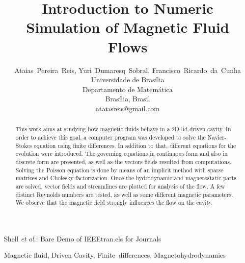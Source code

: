 \documentclass[journal]{IEEEtran}
\begin{document}
\title{Introduction to Numeric Simulation of Magnetic Fluid Flows}

\author{Ataias~Pereira~Reis, Yuri~Dumaresq~Sobral, Francisco~Ricardo~da~Cunha\\Universidade de Brasília\\Departamento de Matemática\\Brasília, Brasil\\ataiasreis@gmail.com}

%
{Shell \MakeLowercase{\textit{et al.}}: Bare Demo of IEEEtran.cls for Journals}

\maketitle


\begin{abstract}
This work aims at studying how magnetic fluids behave in a 2D lid-driven cavity. In order to achieve this goal, a computer program was developed to solve the Navier-Stokes equation using finite differences. In addition to that, different equations for the evolution were introduced. The governing equations in continuous form and also in discrete form are presented, as well as the vectors fields resulted from computations. Solving the Poisson equation is done by means of an implicit method with sparse matrices and Cholesky factorization. Once the hydrodynamic and magnetostatic parts are solved, vector fields and streamlines are plotted for analysis of the flow. A few distinct Reynolds numbers are tested, as well as some different magnetic parameters. We observe that the magnetic field strongly influences the flow on the cavity.

\end{abstract}

\begin{IEEEkeywords}
Magnetic fluid, Driven Cavity, Finite~differences, Magnetohydrodynamics
\end{IEEEkeywords}
\end{document}
